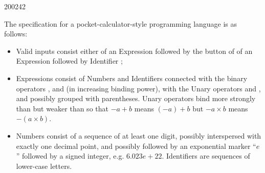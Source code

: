 \documentclass[10pt,\jkfside,a4paper]{article}
\begin{document}
\begin{examquestion}{2002}{4}{2}

The specification for a pocket-calculator-style programming language is as 
follows:

\begin{itemize}

\item Valid inputs consist either of an Expression followed by the
 button of of an Expression followed by 
Identifier ;

\item Expressions consist of Numbers and Identifiers connected with the
binary operators \framebox{$+$}, \framebox{$\times$} and
\framebox{$\uparrow$} (in increasing binding power), with the Unary operators
\framebox{$-$} and , and possibly grouped with parentheses.
Unary operators bind more strongly than \framebox{$+$} but weaker than
\framebox{$\times$} so that $-a + b$ means $(-a) + b$ but $-a \times b$
means $-(a \times b)$.

\item Numbers consist of a sequence of at least one digit, possibly
interspersed with exactly one decimal point, and possibly followed by an
exponential marker ``$e$'' followed by a signed integer, e.g. $6.023e+22$.
Identifiers are sequences of lower-case letters.

\end{itemize}

\begin{enumerate}

\newcommand{\Start}{\mathbf{Start}}
\newcommand{\Unary}{\mathbf{Unary}}
\newcommand{\OptUnary}{\ \mathbf{OptUnary}}
\newcommand{\OptExpression}{\mathbf{OptExpression}}
\newcommand{\Expression}{\mathbf{Expression}}
\newcommand{\Times}{\mathbf{Times}}
\newcommand{\OptTimes}{\mathbf{OptTimes}}
\newcommand{\Arrow}{\mathbf{Power}}
\newcommand{\OptArrow}{\mathbf{OptPower}}
\newcommand{\Value}{\mathbf{Value}}
\newcommand{\Identifier}{\mathbf{Identifier}}
\newcommand{\OptIdentifier}{\mathbf{OptIdentifier}}
\newcommand{\Letter}{\mathbf{Letter}}
\newcommand{\Number}{\mathbf{Number}}
\newcommand{\Int}{\mathbf{Int}}
\newcommand{\OptInt}{\mathbf{OptInt}}
\newcommand{\OptDecimal}{\mathbf{OptDecimal}}
\newcommand{\OptSuffix}{\mathbf{OptSuffix}}
\newcommand{\Sign}{\mathbf{Sign}}


\end{enumerate}
\end{examquestion}
\end{document}
